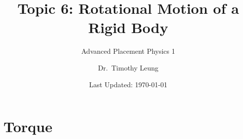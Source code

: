 \documentclass[12pt,compress,aspectratio=169]{beamer}
\title{Topic 6: Rotational Motion of a Rigid Body}
\subtitle{Advanced Placement Physics 1}
\author[TML]{Dr.\ Timothy Leung}
\institute{Olympiads School}
\date{Last Updated: \today}
\begin{document}
\begin{frame}
  \maketitle
\end{frame}





\section{Torque}

\end{document}
